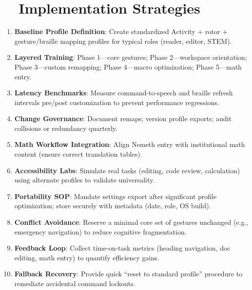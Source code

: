 \section{~~Implementation Strategies}
\label{sec:sr30-implementation}
\begin{enumerate}
	\item \textbf{Baseline Profile Definition}: Create standardized Activity + rotor + gesture/braille mapping profiles for typical roles (reader, editor, STEM).
	\item \textbf{Layered Training}: Phase 1—core gestures; Phase 2—workspace orientation; Phase 3—custom remapping; Phase 4—macro optimization; Phase 5—math entry.
	\item \textbf{Latency Benchmarks}: Measure command-to-speech and braille refresh intervals pre/post customization to prevent performance regressions.
	\item \textbf{Change Governance}: Document remaps; version profile exports; audit collisions or redundancy quarterly.
	\item \textbf{Math Workflow Integration}: Align Nemeth entry with institutional math content (ensure correct translation tables).
	\item \textbf{Accessibility Labs}: Simulate real tasks (editing, code review, calculation) using alternate profiles to validate universality.
	\item \textbf{Portability SOP}: Mandate settings export after significant profile optimization; store securely with metadata (date, role, OS build).
	\item \textbf{Conflict Avoidance}: Reserve a minimal core set of gestures unchanged (e.g., emergency navigation) to reduce cognitive fragmentation.
	\item \textbf{Feedback Loop}: Collect time-on-task metrics (heading navigation, doc editing, math entry) to quantify efficiency gains.
	\item \textbf{Fallback Recovery}: Provide quick “reset to standard profile” procedure to remediate accidental command lockouts.
\end{enumerate}

